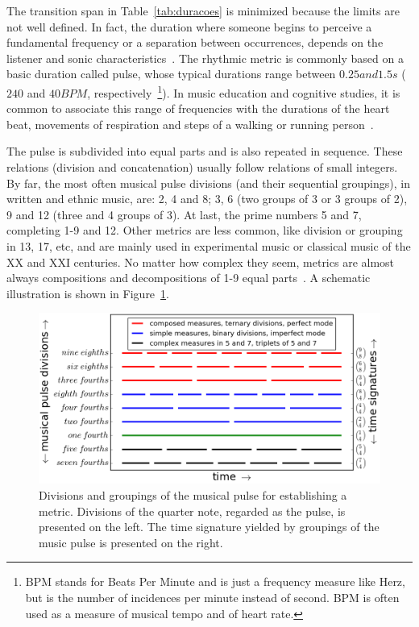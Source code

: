 The transition span in Table~\ref{tab:duracoes} is minimized because the limits
are not well defined. In fact, the duration where someone begins to perceive a
fundamental frequency or a separation between occurrences, depends on the
listener and sonic characteristics~\cite{microsound,Roederer}. The rhythmic metric is commonly based on a basic duration called pulse, whose typical durations range between $0.25 and 1.5s$ ($240$
and $40 BPM$, respectively~\footnote{BPM stands for Beats Per Minute and is just a frequency measure like Herz, but is the number of incidences per minute instead of second. BPM is often used as a measure of musical tempo and of heart rate.}). In music education and cognitive studies, it is common to associate this range of frequencies with the durations of the heart beat, movements of respiration and steps of a walking or running person~\cite{Lacerda,Roederer}.

The pulse is subdivided into equal parts and is also repeated in sequence. These relations (division and concatenation) usually follow relations of small
integers. By far, the most often musical pulse divisions (and their sequential groupings), in written and ethnic
music, are: 2, 4 and 8; 3, 6 (two groups of 3 or 3 groups of 2), 9 and 12 (three and 4 groups of 3). At last, the prime numbers 5 and 7, completing
1-9 and 12. Other metrics are less common, like division or grouping in 13, 17, etc, and are mainly used in experimental music or classical music of the XX and XXI centuries. No matter how complex they seem, metrics are almost always compositions and decompositions of 1-9 equal parts~\cite{Gramani,Roederer}.
A schematic illustration is shown in Figure~\ref{fig:pulsoSubAgl}.

\begin{figure}
    \centering
        \includegraphics[width=.9\textwidth]{figures/metricaMusical__}
    \caption{Divisions and groupings of the musical pulse for establishing a metric. Divisions of the quarter note, regarded as the
        pulse, is presented on the left. The time signature yielded by
        groupings of the music pulse is presented on the right.}
        \label{fig:pulsoSubAgl}
\end{figure}

